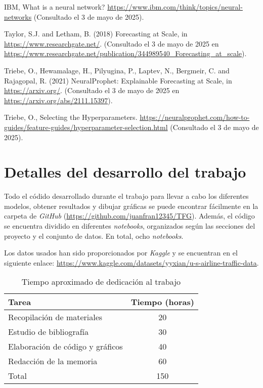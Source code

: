 \documentclass[12pt,twoside]{article}
\begin{document}
\begin{thebibliography}{100}
IBM, What is a neural network? \url{https://www.ibm.com/think/topics/neural-networks} (Consultado el 3 de mayo de 2025).

Taylor, S.J. and Letham, B. (2018) Forecasting at Scale, in \url{https://www.researchgate.net/}. (Consultado el 3 de mayo de 2025 en \url{https://www.researchgate.net/publication/344989540_Forecasting_at_scale}).

Triebe, O., Hewamalage, H., Pilyugina, P., Laptev, N., Bergmeir, C. and Rajagopal, R. (2021) NeuralProphet: Explainable Forecasting at Scale, in \url{https://arxiv.org/}. (Consultado el 3 de mayo de 2025 en \url{https://arxiv.org/abs/2111.15397}).

Triebe, O., Selecting the Hyperparameters. \url{https://neuralprophet.com/how-to-guides/feature-guides/hyperparameter-selection.html} (Consultado el 3 de mayo de 2025).

\end{thebibliography}

\newpage
\appendix

\section{Detalles del desarrollo del trabajo}
Todo el códido desarrollado durante el trabajo para llevar a cabo los diferentes modelos, obtener resultados y dibujar gráficas se puede encontrar fácilmente en la carpeta de \textit{GitHub} (\url{https://github.com/juanfran12345/TFG}). Además, el código se encuentra dividido en diferentes \textit{notebooks}, organizados según las secciones del proyecto y el conjunto de datos. En total, ocho \textit{notebooks}.

Los datos usados han sido proporcionados por \textit{Kaggle} y se encuentran en el siguiente enlace: \href{https://www.kaggle.com/datasets/yyxian/u-s-airline-traffic-data}{https://www.kaggle.com/datasets/yyxian/u-s-airline-traffic-data}.

\begin{table}[ht] 
\centering
\begin{tabular}{lc} 
  \hline
 Tarea & Tiempo (horas) \\ 
  \hline
Recopilación de materiales &   20 \\ 
Estudio de bibliografía &   30 \\ 
Elaboración de código y gráficos &  40 \\ 
Redacción de la memoria &  60 \\
 \hline
Total & 150\\
\hline
\end{tabular}
\caption{Tiempo aproximado de dedicación al trabajo} \label{tab{02}}
\end{table}
\end{document}
